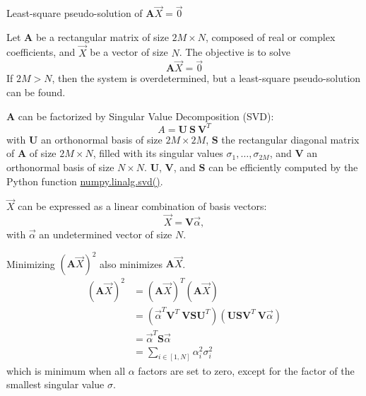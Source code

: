 \newpage
\begin{algorithm}[!ht]
  \caption{Least-square pseudo-solution of \(\textbf{A} \overrightarrow{X} = \overrightarrow{0}\)}\label{alg:svd}
  \begin{algorithmic}[1]
      \STATEx Let $\textbf{A}$ be a rectangular matrix of size $2M \times N$, composed of real or complex coefficients, and $\overrightarrow{X}$ be a vector of size $N$. The objective is to solve 
      \begin{equation}
        \textbf{A} \overrightarrow{X} = \overrightarrow{0}
      \end{equation}
      \STATEx If $2M>N$, then the system is overdetermined, but a least-square pseudo-solution can be found.
      
      \STATE \textbf{A} can be factorized by Singular Value Decomposition (SVD):
      \begin{equation}
        A = \textbf{U} \ \textbf{S} \ \textbf{V}^T
      \end{equation}
      with $\textbf{U}$ an orthonormal basis of size $2M \times 2M$, \(\textbf{S}\) the rectangular diagonal matrix of \textbf{A} of size $2M \times N$, filled with its singular values \(\sigma_1, \dots, \sigma_{2M}\), and $\textbf{V}$ an orthonormal basis of size $N \times N$. $\textbf{U}$, $\textbf{V}$, and $\textbf{S}$ can be efficiently computed by the Python function \href{https://numpy.org/doc/stable/reference/generated/numpy.linalg.svd.html}{numpy.linalg.svd()}.
      
      \STATE \(\overrightarrow{X}\) can be expressed as a linear combination of basis vectors: 
      \begin{equation}\label{eq:xva}
        \overrightarrow{X} = \textbf{V} \overrightarrow{\alpha},
      \end{equation}
      with \(\overrightarrow{\alpha}\) an undetermined vector of size $N$.  
      
      \STATE Minimizing \((\textbf{A}\overrightarrow{X})^2\) also minimizes \(\textbf{A}\overrightarrow{X}\).
      \begin{equation}
          \begin{aligned}
          (\textbf{A}\overrightarrow{X})^2 & = (\textbf{A} \overrightarrow{X})^T (\textbf{A} \overrightarrow{X})\\
          & = (\overrightarrow{\alpha}^T \textbf{V}^T \ \textbf{V} \textbf{S} \textbf{U}^T)(\textbf{U} \textbf{S} \textbf{V}^T \ \textbf{V}\overrightarrow{\alpha})\\
          & = \overrightarrow{\alpha}^T \textbf{S} \overrightarrow{\alpha}\\
          & = \sum_{i \in [1,N]} \alpha_i^2 \sigma_i^2
          \end{aligned}
      \end{equation}
      which is minimum when all \(\alpha\) factors are set to zero, except for the factor of the smallest singular value \(\sigma\). 


\end{algorithmic}
\end{algorithm}
